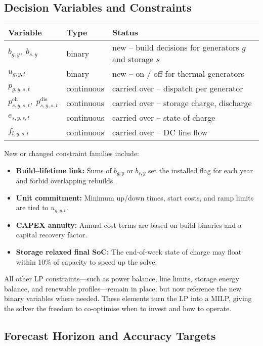 \subsection{Decision Variables and Constraints}

\begin{center}
\begin{tabular}{lll}
\textbf{Variable} & \textbf{Type} & \textbf{Status} \\
\hline
$b_{g,y},\;b_{s,y}$ & binary & new -- build decisions for generators $g$ and storage $s$ \\
$u_{g,y,t}$ & binary & new -- on / off for thermal generators \\
$p_{g,y,s,t}$ & continuous & carried over -- dispatch per generator \\
$p^{\text{ch}}_{s,y,s,t},\;p^{\text{dis}}_{s,y,s,t}$ & continuous & carried over -- storage charge, discharge \\
$e_{s,y,s,t}$ & continuous & carried over -- state of charge \\
$f_{l,y,s,t}$ & continuous & carried over -- DC line flow \\
\end{tabular}
\end{center}

New or changed constraint families include:
\begin{itemize}
    \item \textbf{Build--lifetime link:} Sums of $b_{g,y}$ or $b_{s,y}$ set the installed flag for each year and forbid overlapping rebuilds.
    \item \textbf{Unit commitment:} Minimum up/down times, start costs, and ramp limits are tied to $u_{g,y,t}$.
    \item \textbf{CAPEX annuity:} Annual cost terms are based on build binaries and a capital recovery factor.
    \item \textbf{Storage relaxed final SoC:} The end-of-week state of charge may float within 10\% of capacity to speed up the solve.
\end{itemize}

All other LP constraints—such as power balance, line limits, storage energy balance, and renewable profiles—remain in place, but now reference the new binary variables where needed.
These elements turn the LP into a MILP, giving the solver the freedom to co-optimise when to invest and how to operate.

\subsection{Forecast Horizon and Accuracy Targets}

